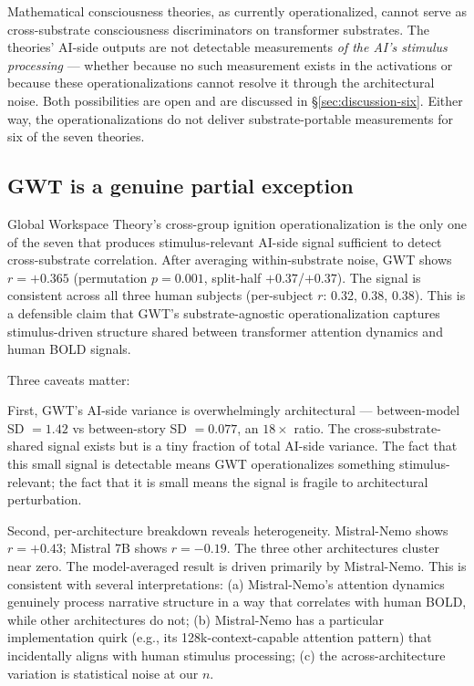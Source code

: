 \documentclass[11pt,a4paper]{article}
\begin{document}
Mathematical consciousness theories, as currently operationalized, cannot serve as cross-substrate consciousness discriminators on transformer substrates. The theories' AI-side outputs are not detectable measurements \emph{of the AI's stimulus processing} --- whether because no such measurement exists in the activations or because these operationalizations cannot resolve it through the architectural noise. Both possibilities are open and are discussed in \S\ref{sec:discussion-six}. Either way, the operationalizations do not deliver substrate-portable measurements for six of the seven theories.

\subsection{GWT is a genuine partial exception}

Global Workspace Theory's cross-group ignition operationalization is the only one of the seven that produces stimulus-relevant AI-side signal sufficient to detect cross-substrate correlation. After averaging within-substrate noise, GWT shows $r = +0.365$ (permutation $p = 0.001$, split-half $+0.37$/$+0.37$). The signal is consistent across all three human subjects (per-subject $r$: 0.32, 0.38, 0.38). This is a defensible claim that GWT's substrate-agnostic operationalization captures stimulus-driven structure shared between transformer attention dynamics and human BOLD signals.

Three caveats matter:

First, GWT's AI-side variance is overwhelmingly architectural --- between-model SD $= 1.42$ vs between-story SD $= 0.077$, an $18\times$ ratio. The cross-substrate-shared signal exists but is a tiny fraction of total AI-side variance. The fact that this small signal is detectable means GWT operationalizes something stimulus-relevant; the fact that it is small means the signal is fragile to architectural perturbation.

Second, per-architecture breakdown reveals heterogeneity. Mistral-Nemo shows $r = +0.43$; Mistral 7B shows $r = -0.19$. The three other architectures cluster near zero. The model-averaged result is driven primarily by Mistral-Nemo. This is consistent with several interpretations: (a) Mistral-Nemo's attention dynamics genuinely process narrative structure in a way that correlates with human BOLD, while other architectures do not; (b) Mistral-Nemo has a particular implementation quirk (e.g., its 128k-context-capable attention pattern) that incidentally aligns with human stimulus processing; (c) the across-architecture variation is statistical noise at our $n$.
\end{document}
